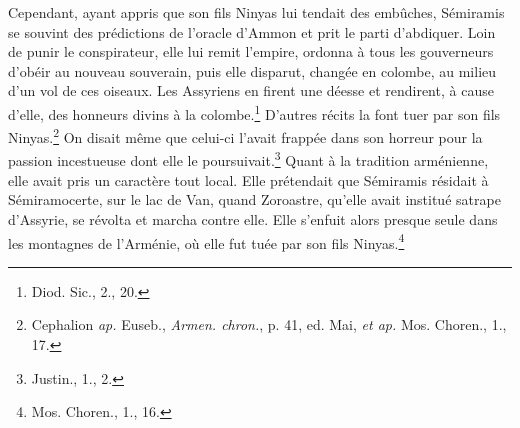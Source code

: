\documentclass[a4paper, 11pt, oneside, landscape]{article}
\begin{document}
Cependant, ayant appris que son fils Ninyas lui tendait des embûches, Sémiramis se souvint des prédictions de l'oracle d'Ammon et prit le parti d'abdiquer. Loin de punir le conspirateur, elle lui remit l'empire, ordonna à tous les gouverneurs d'obéir au nouveau souverain, puis elle disparut, changée en colombe, au milieu d'un vol de ces oiseaux. Les Assyriens en firent une déesse et rendirent, à cause d'elle, des honneurs divins à la colombe.\footnote{Diod. Sic., 2., 20.} D'autres récits la font tuer par son fils Ninyas.\footnote{Cephalion \emph{ap.} Euseb., \emph{Armen. chron.}, p. 41, ed. Mai, \emph{et ap.} Mos. Choren., 1., 17.} On disait même que celui-ci l'avait frappée dans son horreur pour la passion incestueuse dont elle le poursuivait.\footnote{Justin., 1., 2.} Quant à la tradition arménienne, elle avait pris un caractère tout local. Elle prétendait que Sémiramis résidait à Sémiramocerte, sur le lac de Van, quand Zoroastre, qu'elle avait institué satrape d'Assyrie, se révolta et marcha contre elle. Elle s'enfuit alors presque seule dans les montagnes de l'Arménie, où elle fut tuée par son fils Ninyas.\footnote{Mos. Choren., 1., 16.}
\end{document}

